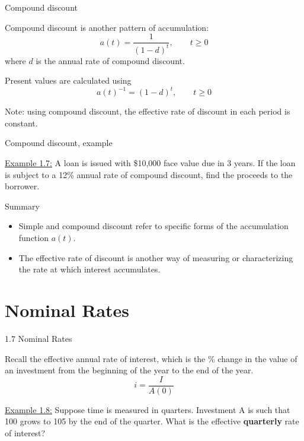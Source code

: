 \documentclass{beamer}
\begin{document}
\begin{frame}{Compound discount}

Compound discount is another pattern of accumulation:
\[
a(t) = \frac{1}{(1-d)^t}, \qquad t \ge 0
\]
where $d$ is the annual rate of compound discount.

\bigskip
Present values are calculated using
\[
a(t)^{-1} = (1-d)^t, \qquad t \ge 0
\]

Note: using compound discount, the effective rate of discount in each period is constant.

\end{frame}

\begin{frame}{Compound discount, example}

\underline{Example 1.7:} A loan is issued with \$10,000 face value due in 3 years. If the loan is subject to a 12\% annual rate of compound discount, find the proceeds to the borrower.

\vfill
\end{frame}

\begin{frame}{Summary}

\begin{itemize}
\item Simple and compound discount refer to specific forms of the accumulation function $a(t)$.
\bigskip
\item The effective rate of discount is another way of measuring or characterizing the rate at which interest accumulates.
\end{itemize}

\end{frame}

\section{Nominal Rates}

\begin{frame}{1.7 Nominal Rates}

Recall the effective annual rate of interest, which is the \% change in the value of an investment from the beginning of the year to the end of the year.
\[
i = \frac{I}{A(0)}
\]

\underline{Example 1.8:} Suppose time is measured in quarters. Investment A is such that 100 grows to 105 by the end of the quarter. What is the effective \textbf{quarterly} rate of interest?

\vfill
\end{frame}
\end{document}
